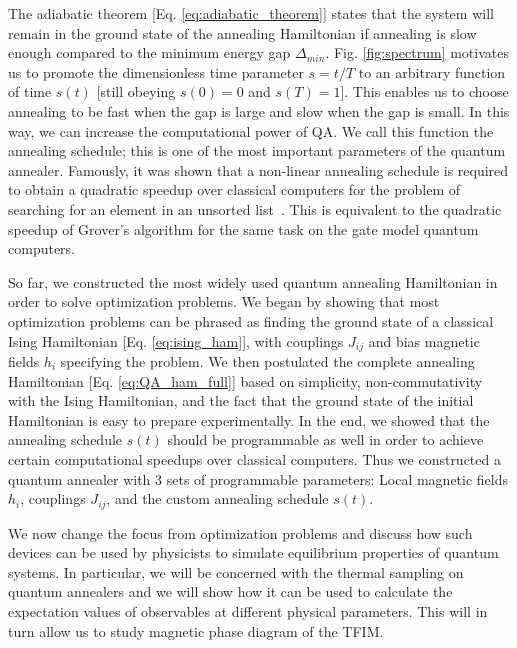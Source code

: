 \documentclass[12pt,a4paper]{article}
\begin{document}
\hspace*{0.3cm}
The adiabatic theorem [Eq. \eqref{eq:adiabatic_theorem}] states that the system will remain in the ground state of the annealing Hamiltonian
if annealing is slow enough compared to the minimum energy gap $\Delta_{min}$.
Fig. \ref{fig:spectrum} motivates us to promote the dimensionless time parameter $s=t/T$ to an arbitrary function of time $s(t)$
[still obeying $s(0) = 0$ and $s(T) = 1$]. This enables us to choose annealing to be fast when the gap is
large and slow when the gap is small. In this way, we can increase the computational power of QA. We call
this function the annealing schedule; this is one of the most important parameters of the quantum annealer.
Famously, it was shown that a non-linear annealing schedule is required to obtain a quadratic speedup
over classical computers for the problem of searching for an element in an unsorted list~\cite{roland2002}.
This is equivalent to the quadratic speedup of Grover's algorithm for the same task on the gate model quantum computers.

\hspace*{0.3cm}
So far, we constructed the most widely used quantum annealing Hamiltonian in order to solve optimization problems.
We began by showing that most optimization problems can be phrased as finding the ground state of a classical Ising
Hamiltonian [Eq. \eqref{eq:ising_ham}], with couplings $J_{ij}$ and bias magnetic fields $h_i$ specifying the problem.
We then postulated the complete annealing Hamiltonian [Eq. \eqref{eq:QA_ham_full}] based on simplicity, non-commutativity
with the Ising Hamiltonian, and the fact that the ground state of the initial Hamiltonian is easy to prepare
experimentally. In the end, we showed that the annealing schedule $s(t)$ should be programmable as well
in order to achieve certain computational speedups over classical computers. Thus we constructed a quantum annealer
with 3 sets of programmable parameters: Local magnetic fields $h_i$, couplings $J_{ij}$, and the custom annealing schedule $s(t)$.

\hspace*{0.3cm}
We now change the focus from optimization problems and discuss how such devices can be used by physicists
to simulate equilibrium properties of quantum systems. In particular, we will be concerned with
the thermal sampling on quantum annealers and we will show how it can be used to calculate the expectation values of observables
at different physical parameters. This will in turn allow us to study magnetic phase diagram of the TFIM.
\end{document}
